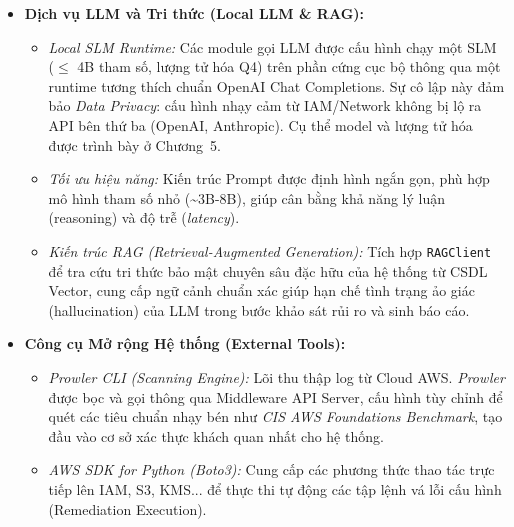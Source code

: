 \begin{itemize}
  \item \textbf{Dịch vụ LLM và Tri thức (Local LLM \& RAG):} 
    \begin{itemize}
      \item \textit{Local SLM Runtime:} Các module gọi LLM được cấu hình chạy một SLM ($\leq$ 4B tham số, lượng tử hóa Q4) trên phần cứng cục bộ thông qua một runtime tương thích chuẩn OpenAI Chat Completions. Sự cô lập này đảm bảo \textit{Data Privacy}: cấu hình nhạy cảm từ IAM/Network không bị lộ ra API bên thứ ba (OpenAI, Anthropic). Cụ thể model và lượng tử hóa được trình bày ở Chương~5.
      \item \textit{Tối ưu hiệu năng:} Kiến trúc Prompt được định hình ngắn gọn, phù hợp mô hình tham số nhỏ (\textasciitilde 3B-8B), giúp cân bằng khả năng lý luận (reasoning) và độ trễ (\textit{latency}).
      \item \textit{Kiến trúc RAG (Retrieval-Augmented Generation):} Tích hợp \texttt{RAGClient} để tra cứu tri thức bảo mật chuyên sâu đặc hữu của hệ thống từ CSDL Vector, cung cấp ngữ cảnh chuẩn xác giúp hạn chế tình trạng ảo giác (hallucination) của LLM trong bước khảo sát rủi ro và sinh báo cáo.
    \end{itemize}

  \item \textbf{Công cụ Mở rộng Hệ thống (External Tools):} 
    \begin{itemize}
      \item \textit{Prowler CLI (Scanning Engine):} Lõi thu thập log từ Cloud AWS. \textit{Prowler} được bọc và gọi thông qua Middleware API Server, cấu hình tùy chỉnh để quét các tiêu chuẩn nhạy bén như \textit{CIS AWS Foundations Benchmark}, tạo đầu vào cơ sở xác thực khách quan nhất cho hệ thống.
      \item \textit{AWS SDK for Python (Boto3):} Cung cấp các phương thức thao tác trực tiếp lên IAM, S3, KMS... để thực thi tự động các tập lệnh vá lỗi cấu hình (Remediation Execution).
    \end{itemize}


\end{itemize}
